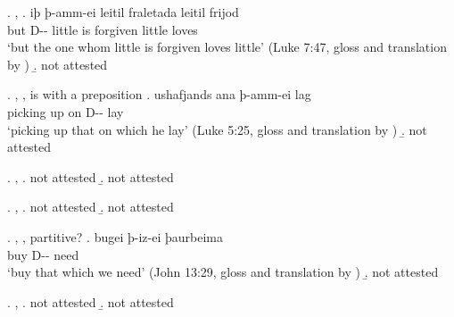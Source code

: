 \ex. , 
\ag. iþ þ-amm-ei leitil fraletada leitil frijod\\
 but D-- little {is forgiven\scsub{[dat]}} little loves\scsub{[nom]}\\
 `but the one whom little is forgiven loves little' \hfill (Luke 7:47, gloss and translation by \citealt[342]{harbert1978})
\b.  not attested

\ex. , , is with a preposition
\ag. ushafjands ana þ-amm-ei lag\\
 {picking up}\scsub{[acc]}\scsub{[dat]} on D-- lay\\
 `picking up that on which he lay' \hfill (Luke 5:25, gloss and translation by \citealt[343]{harbert1978})
\b.  not attested

\ex. , 
\a.  not attested
\b.  not attested

\ex.  , 
\a.  not attested
\b.  not attested

\ex. , , partitive?
\ag. bugei þ-iz-ei þaurbeima\\
 buy\scsub{[acc]} D-- need\scsub{[gen]}\\
 `buy that which we need' \hfill (John 13:29, gloss and translation by \citealt[343]{harbert1978})
\b.  not attested

\ex. , 
\a.  not attested
\b.  not attested

